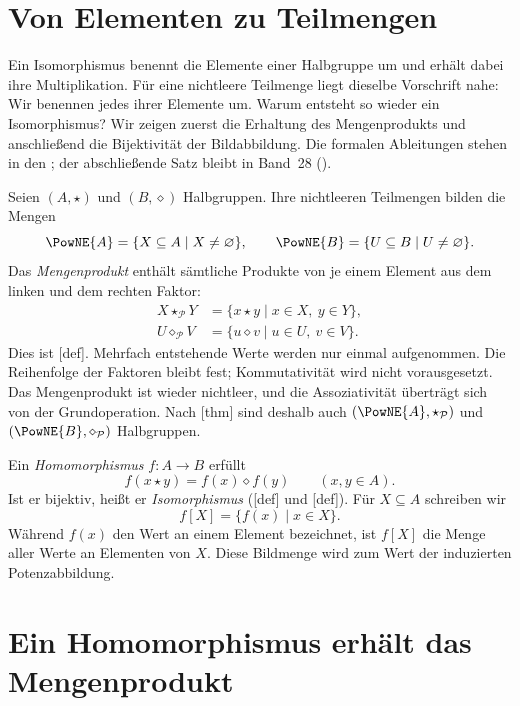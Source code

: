 \section*{Von Elementen zu Teilmengen}
\hypertarget{power-isomorphisms.reading}{}

Ein Isomorphismus benennt die Elemente einer Halbgruppe um und erhält
 dabei ihre Multiplikation. Für eine nichtleere Teilmenge liegt dieselbe
 Vorschrift nahe: Wir benennen jedes ihrer Elemente um. Warum entsteht
 so wieder ein Isomorphismus? Wir zeigen zuerst die Erhaltung des
 Mengenprodukts und anschließend die Bijektivität der Bildabbildung.
 Die formalen Ableitungen stehen in den \PowerIsoProofsLink{};
 der abschließende Satz bleibt in Band~28 (\PowerIsoMainLink{}).

Seien \((A,\star)\) und \((B,\diamond)\) Halbgruppen. Ihre
nichtleeren Teilmengen bilden die Mengen
\[
  \PowNE{A}=\{X\subseteq A\mid X\ne\varnothing\},
  \qquad
  \PowNE{B}=\{U\subseteq B\mid U\ne\varnothing\}.
\]
Das \emph{Mengenprodukt} enthält sämtliche Produkte von je einem
Element aus dem linken und dem rechten Faktor:
\[
  \begin{aligned}
    X\star_{\mathcal P}Y
      &=\{x\star y\mid x\in X,\ y\in Y\},\\
    U\diamond_{\mathcal P}V
      &=\{u\diamond v\mid u\in U,\ v\in V\}.
  \end{aligned}
\]
Dies ist [def]. Mehrfach
entstehende Werte werden nur einmal aufgenommen. Die Reihenfolge
der Faktoren bleibt fest; Kommutativität wird nicht vorausgesetzt.
Das Mengenprodukt ist wieder nichtleer, und die Assoziativität
überträgt sich von der Grundoperation. Nach
[thm] sind deshalb auch
\((\PowNE{A},\star_{\mathcal P})\) und
\((\PowNE{B},\diamond_{\mathcal P})\) Halbgruppen.

Ein \emph{Homomorphismus} \(f\colon A\to B\) erfüllt
\[
  f(x\star y)=f(x)\diamond f(y)\qquad(x,y\in A).
\]
Ist er bijektiv, heißt er \emph{Isomorphismus}
([def] und
[def]). Für \(X\subseteq A\) schreiben wir
\[
  f[X]=\{f(x)\mid x\in X\}.
\]
Während \(f(x)\) den Wert an einem Element bezeichnet, ist
\(f[X]\) die Menge aller Werte an Elementen von \(X\).
Diese Bildmenge wird zum Wert der induzierten Potenzabbildung.

\clearpage
\section*{Ein Homomorphismus erhält das Mengenprodukt}
\hypertarget{power-isomorphisms.reading.product}{}

